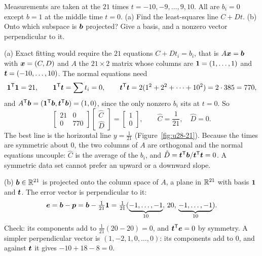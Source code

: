 \begin{example}\label{ex:u28-21}
Measurements are taken at the $21$ times $t=-10,-9,\dots,9,10$. All are $b_i=0$ except
$b=1$ at the middle time $t=0$. (a) Find the least-squares line $C+Dt$. (b) Onto which
subspace is $\boldsymbol{b}$ projected? Give a basis, and a nonzero vector perpendicular to it.

(a) Exact fitting would require the $21$ equations $C+Dt_i=b_i$, that is
$A\boldsymbol{x}=\boldsymbol{b}$ with $\boldsymbol{x}=(C,D)$ and $A$ the $21\times2$ matrix whose columns are
$\boldsymbol{1}=(1,\dots,1)$ and $\boldsymbol{t}=(-10,\dots,10)$. The normal equations need
\[
  \boldsymbol{1}^{\mathsf{T}}\boldsymbol{1}=21,\qquad \boldsymbol{1}^{\mathsf{T}}\boldsymbol{t}=\sum t_i=0,\qquad
  \boldsymbol{t}^{\mathsf{T}}\boldsymbol{t}=2(1^{2}+2^{2}+\dots+10^{2})=2\cdot385=770,
\]
and $A^{\mathsf{T}}\boldsymbol{b}=(\boldsymbol{1}^{\mathsf{T}}\boldsymbol{b},\boldsymbol{t}^{\mathsf{T}}\boldsymbol{b})=(1,0)$, since the only nonzero $b_i$ sits at
$t=0$. So
\[
  \begin{bmatrix} 21&0\\ 0&770\end{bmatrix}\begin{bmatrix}\hat C\\ \hat D\end{bmatrix}
  =\begin{bmatrix} 1\\ 0\end{bmatrix},\qquad \hat C=\frac1{21},\quad \hat D=0 .
\]
The best line is the horizontal line $y=\tfrac1{21}$ (Figure~\ref{fig:u28-21}). Because the
times are symmetric about $0$, the two columns of $A$ are orthogonal and the normal equations
uncouple: $\hat C$ is the average of the $b_i$, and $\hat D=\boldsymbol{t}^{\mathsf{T}}\boldsymbol{b}/\boldsymbol{t}^{\mathsf{T}}\boldsymbol{t}=0$.
A symmetric data set cannot prefer an upward or a downward slope.

(b) $\boldsymbol{b}\in\mathbb{R}^{21}$ is projected onto the column space of $A$, a plane in $\mathbb{R}^{21}$ with
basis $\boldsymbol{1}$ and $\boldsymbol{t}$. The error vector is perpendicular to it:
\[
  \boldsymbol{e}=\boldsymbol{b}-\boldsymbol{p}=\boldsymbol{b}-\tfrac1{21}\boldsymbol{1}=\tfrac1{21}(\underbrace{-1,\dots,-1}_{10},\,20,\,\underbrace{-1,\dots,-1}_{10}).
\]
Check: its components add to $\tfrac1{21}(20-20)=0$, and $\boldsymbol{t}^{\mathsf{T}}\boldsymbol{e}=0$ by symmetry. A
simpler perpendicular vector is $(1,-2,1,0,\dots,0)$: its components add to $0$, and against
$\boldsymbol{t}$ it gives $-10+18-8=0$.
\end{example}

